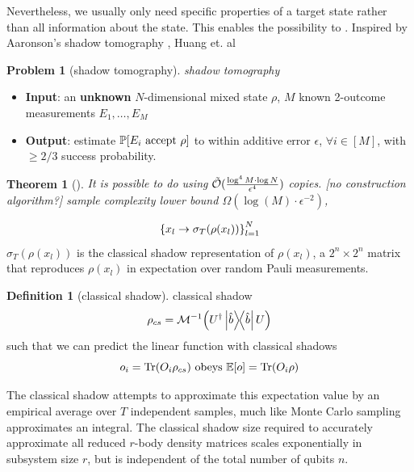 \documentclass[
10pt,
aps,
pra,
linenumbers,
floatfix,
]{revtex4-2}
\theoremstyle{plain}
\newtheorem{theorem}{Theorem}
\theoremstyle{definition}
\newtheorem{definition}{Definition}
\newtheorem{remark}{Remark}
\newtheorem{problem}{Problem}
\newcommand{\dm}{\rho}
\begin{document}
Nevertheless, we usually only need specific properties of a target state rather than all information about the state.
This enables the possibility to .
Inspired by Aaronson's shadow tomography \cite{aaronsonShadowTomographyQuantum2018}, Huang et. al \cite{huangPredictingManyProperties2020}
\begin{problem}[shadow tomography]\label{prm:shadow_tomography}
	\emph{shadow tomography}
	\begin{itemize}
		\item \textbf{Input}: an \textbf{unknown} $N$-dimensional mixed state $\rho$, $M$ known 2-outcome measurements $E_1,\dots,E_M$
		\item \textbf{Output}: estimate $\probability[E_i \text{ accept } \dm]$ to within additive error $\epsilon$, $\forall i\in [M]$, with $\ge 2/3$ success probability.	
	\end{itemize}
\end{problem}
\begin{theorem}[\cite{aaronsonShadowTomographyQuantum2018}]\label{thm:shadow_tomography}
	It is possible to do  using $\tilde{\mathcal{O}}(\frac{\log^4 M\cdot \log N}{\epsilon^4})$ copies. [no construction algorithm?]
	sample complexity lower bound $\Omega(\log (M) \cdot \epsilon^{-2})$, 
\end{theorem}
\begin{equation}
	\qty{x_l\to\sigma_T(\dm(x_l))}_{l=1}^N
\end{equation}
$\sigma_T(\dm(x_l))$ is the classical shadow representation of $\dm(x_l)$, 
a $2^n\times 2^n$ matrix that reproduces $\dm(x_l)$ in expectation over random Pauli measurements.
\begin{definition}[classical shadow]\label{def:classical_shadow}
	classical shadow
	\begin{equation}
		\dm_{cs} = \mathcal{M}^{-1} \qty(U^\dagger \op{\hat{b}} U)
	\end{equation}
	such that we can predict the linear function with classical shadows
	\begin{equation}
		o_i = \Tr(O_i \dm_{cs})
		\text{ obeys }
		\expectation[o] =\Tr(O_i \dm)
	\end{equation}
\end{definition}
The classical shadow attempts to approximate this expectation value by an empirical average over $T$ independent samples, much like Monte Carlo sampling approximates an integral.
The classical shadow size required to accurately approximate all reduced $r$-body density matrices scales exponentially in subsystem size $r$, but is independent of the total number of qubits $n$.
\end{document}
